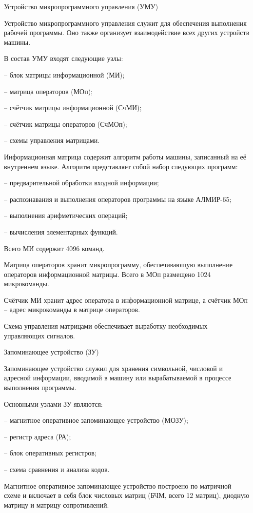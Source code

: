 \documentclass[11pt]{article}
\begin{document}
Устройство микропрограммного
управления (УМУ)

Устройство микропрограммного
управления служит для обеспечения
выполнения рабочей программы. Оно
также организует взаимодействие всех
других устройств машины.

В состав УМУ входят следующие узлы:

– блок матрицы информационной (МИ);

– матрица операторов (МОп);

– счётчик матрицы информационной
(СчМИ);

–\- счётчик матрицы операторов (СчМОп);

– схемы управления матрицами.

Информационная матрица содержит
алгоритм работы машины, записанный на
её внутреннем языке. Алгоритм
представляет собой набор следующих
программ:

– предварительной обработки входной
информации;

– распознавания и выполнения
операторов программы на языке АЛМИР-65;

– выполнения арифметических операций;

– вычисления элементарных функций.

Всего МИ содержит 4096 команд.

Матрица операторов хранит
микропрограмму, обеспечивающую
выполнение операторов информационной
матрицы. Всего в МОп размещено 1024
микрокоманды.

Счётчик МИ хранит адрес оператора в
информационной матрице, а счётчик МОп
– адрес микрокоманды в матрице
операторов.

Схема управления матрицами
обеспечивает выработку необходимых
управляющих сигналов.

Запоминающее устройство (ЗУ)

Запоминающее устройство служил для
хранения символьной, числовой и
адресной информации, вводимой в машину
или вырабатываемой в процессе
выполнения программы.

Основными узлами ЗУ являются:

– магнитное оперативное запоминающее
устройство (МОЗУ);

– регистр адреса (РА);

– блок оперативных регистров;

– схема сравнения и анализа кодов.

Магнитное оперативное запоминающее
устройство построено по матричной
схеме и включает в себя блок числовых
матриц (БЧМ, всего 12 матриц), диодную
матрицу и матрицу сопротивлений.
\end{document}
